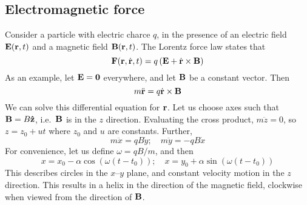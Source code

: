 \subsection{Electromagnetic force}
Consider a particle with electric charce \(q\), in the presence of an electric field \(\vb E(\vb r, t)\) and a magnetic field \(\vb B(\vb r, t)\).
The Lorentz force law states that
\[
	\vb F(\vb r, \dot{\vb r}, t) = q\left( \vb E + \dot{\vb r} \times \vb B \right)
\]
As an example, let \(\vb E = \vb 0\) everywhere, and let \(\vb B\) be a constant vector.
Then
\[
	m \ddot{\vb r} = q \dot{\vb r} \times \vb B
\]
We can solve this differential equation for \(\vb r\).
Let us choose axes such that \(\vb B = B \vu{z}\), i.e.\ \(\vb B\) is in the \(z\) direction.
Evaluating the cross product, \(m \ddot{z} = 0\), so \(z = z_0 + ut\) where \(z_0\) and \(u\) are constants.
Further,
\[
	m \ddot x = qB\dot y;\quad m \ddot y = -qB\dot x
\]
For convenience, let us define \(\omega = qB/m\), and then
\[
	x = x_0 - \alpha \cos(\omega(t - t_0));\quad x = y_0 + \alpha \sin(\omega(t - t_0))
\]
This describes circles in the \(x\)--\(y\) plane, and constant velocity motion in the \(z\) direction.
This results in a helix in the direction of the magnetic field, clockwise when viewed from the direction of \(\vb B\).
